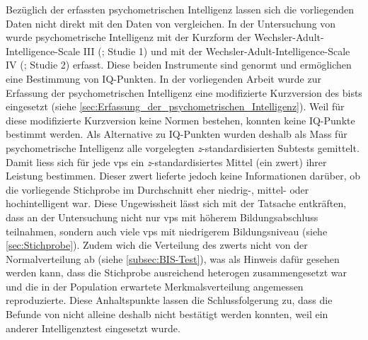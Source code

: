 \documentclass[11pt, twoside, a4paper]{book}		%
\begin{document}
Bezüglich der erfassten psychometrischen Intelligenz lassen sich die vorliegenden Daten nicht direkt mit den Daten von \citet{Melnick2013} vergleichen. In der Untersuchung von \citeauthor{Melnick2013} wurde psychometrische Intelligenz mit der Kurzform der Wechsler-Adult-Intelligence-Scale III (\citealp{Axelrod2002}; Studie 1) und mit der Wechsler-Adult-In\-tell\-igence-Scale IV (\citealp{Wechsler2008}; Studie 2) erfasst. Diese beiden Instrumente sind genormt und ermöglichen eine Bestimmung von IQ-Punkten. In der vorliegenden Arbeit wurde zur Erfassung der psychometrischen Intelligenz eine modifizierte Kurzversion des \gls{bist}s eingesetzt (siehe \autoref{sec:Erfassung_der_psychometrischen_Intelligenz}). Weil für diese modifizierte Kurzversion keine Normen bestehen, konnten keine IQ-Punkte bestimmt werden. Als Alternative zu IQ-Punkten wurden deshalb als Mass für psychometrische Intelligenz alle vorgelegten \textit{z}-standardisierten Subtests gemittelt. Damit liess sich für jede \glspl{vp} ein \textit{z}-standardisiertes Mittel (ein \gls{zwert}) ihrer Leistung bestimmen. Dieser \gls{zwert} lieferte jedoch keine Informationen darüber, ob die vorliegende Stichprobe im Durchschnitt eher niedrig-, mittel- oder hochintelligent war. Diese Ungewissheit lässt sich mit der Tatsache entkräften, dass an der Untersuchung nicht nur \glspl{vp} mit höherem Bildungsabschluss teilnahmen, sondern auch viele \glspl{vp} mit niedrigerem Bildungsniveau (siehe \autoref{sec:Stichprobe}). 
Zudem wich die Verteilung des \gls{zwert}s nicht von der Normalverteilung ab (siehe \autoref{subsec:BIS-Test}), was als Hinweis dafür gesehen werden kann, dass die Stichprobe ausreichend heterogen zusammengesetzt war und die in der Population erwartete Merkmalsverteilung angemessen reproduzierte. Diese Anhaltspunkte lassen die Schlussfolgerung zu, dass die Befunde von \citeauthor{Melnick2013} nicht alleine deshalb nicht bestätigt werden konnten, weil ein anderer Intelligenztest eingesetzt wurde.


\end{document}
